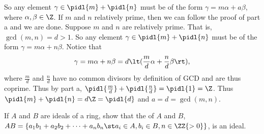 \documentclass{article}
\begin{document}
\begin{solution}
\begin{enumerate}[label=\bd{\alph*.}]
    So any element \(\gamma\in\pidl{m} + \pidl{n} \) must be of the form \( \gamma=m\alpha+a\beta \), where \( \alpha,\beta\in\Z \).
    If \( m \) and \( n \) relatively prime, then we can follow the proof of part a and we are done.
    Suppose \( m \) and \( n \) are  relatively prime. That is, \( \gcd(m,n) = d > 1\). So any element \( \gamma\in\pidl{m}+\pidl{n} \) must be of the form \( \gamma=m\alpha+n\beta \). Notice that \begin{align*}
      \gamma = m\alpha+n\beta = d\lt(\frac{m}{d}\alpha+\frac{n}{d}\beta\rt),
    \end{align*} where \( \frac{m}{d} \) and \( \frac{n}{d} \) have no common divisors by definition of GCD and are thus coprime.
    Thus by part a, \( \pidl{\frac{m}{d}}+\pidl{\frac{n}{d}}=\pidl{1}=\Z \).
    Thus \( \pidl{m}+\pidl{n} = d\Z = \pidl{d} \) and \( a = d = \gcd(m,n) \).
\end{enumerate}
\end{solution}

If \( A \) and \( B \) are ideals of a ring, show that the  of \( A \) and \( B \), \( AB = \{a_1b_1 + a_2b_2 + \cdots + a_nb_n \st a_i\in A, b_i\in B, n \in\ZZ{>0}\} \), is an ideal.
\end{document}
